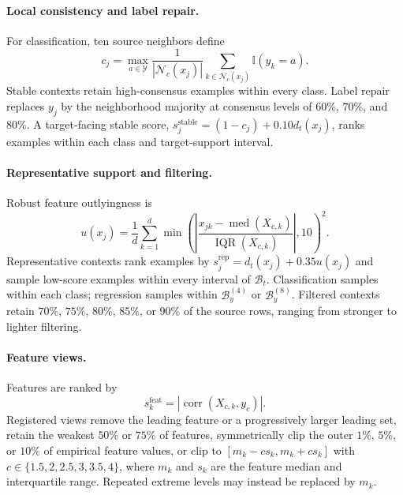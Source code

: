 \paragraph{Local consistency and label repair.}
For classification, ten source neighbors define
\begin{equation}
  c_j=\max_{a\in\mathcal Y}\frac{1}{|\mathcal N_c(x_j)|}
  \sum_{k\in\mathcal N_c(x_j)}\mathbb I(y_k=a).
  \label{eq:local-class-consensus}
\end{equation}
Stable contexts retain high-consensus examples within every class. Label repair
replaces $y_j$ by the neighborhood majority at consensus levels of
$60\%$, $70\%$, and $80\%$. A target-facing stable score,
$s_j^{\mathrm{stable}}=(1-c_j)+0.10d_t(x_j)$, ranks examples within each
class and target-support interval.

\paragraph{Representative support and filtering.}
Robust feature outlyingness is
\begin{equation}
  u(x_j)=\frac{1}{d}\sum_{k=1}^{d}
  \min\!\left(\left|\frac{x_{jk}-\operatorname{med}(X_{c,k})}
  {\operatorname{IQR}(X_{c,k})}\right|,10\right)^2.
  \label{eq:robust-feature-outlyingness}
\end{equation}
Representative contexts rank examples by
$s_j^{\mathrm{rep}}=d_t(x_j)+0.35u(x_j)$ and sample low-score examples
within every interval of $\mathcal B_t$. Classification samples within each
class; regression samples within $\mathcal B_y^{(4)}$ or
$\mathcal B_y^{(8)}$. Filtered contexts retain
$70\%$, $75\%$, $80\%$, $85\%$, or $90\%$ of the source rows, ranging from
stronger to lighter filtering.

\paragraph{Feature views.}
Features are ranked by
\begin{equation}
  s_k^{\mathrm{feat}}
  =|\operatorname{corr}(X_{c,k},y_c)|.
  \label{eq:feature-construction-score}
\end{equation}
Registered views remove the leading feature or a progressively larger leading
set, retain the weakest $50\%$ or $75\%$ of features, symmetrically clip the
outer $1\%$, $5\%$, or $10\%$ of empirical feature values, or clip to
$[m_k-cs_k,m_k+cs_k]$ with
$c\in\{1.5,2,2.5,3,3.5,4\}$, where $m_k$ and $s_k$ are the
feature median and interquartile range. Repeated extreme levels may instead be
replaced by $m_k$.

